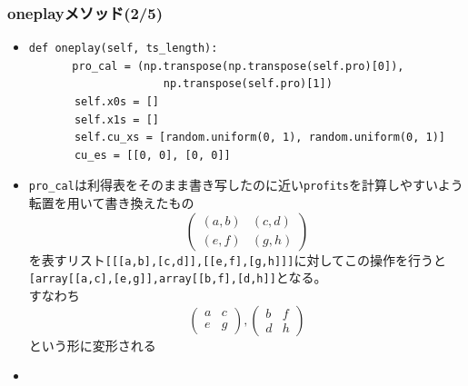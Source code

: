 \documentclass[dvipdfmx,fleqn,handout]{beamer}
\begin{document}
\begin{frame}[fragile]%
\frametitle{oneplayメソッド(2/5)}
\begin{itemize}\setlength{\parskip}{0.5em}
\item
\footnotesize
\begin{verbatim}
def oneplay(self, ts_length):
　　　　pro_cal = (np.transpose(np.transpose(self.pro)[0]),
                   　np.transpose(self.pro)[1])
       self.x0s = []
       self.x1s = []
       self.cu_xs = [random.uniform(0, 1), random.uniform(0, 1)]
       cu_es = [[0, 0], [0, 0]]
 \end{verbatim}
\normalsize
\item
\verb|pro_cal|は利得表をそのまま書き写したのに近い\verb|profits|を計算しやすいよう転置を用いて書き換えたもの\pause
\footnotesize
\begin{equation*}
\begin{pmatrix}
(a,b) & (c,d)\\
(e,f) & (g,h)
\end{pmatrix}
\end{equation*}
\normalsize
を表すリスト\verb|[[[a,b],[c,d]],[[e,f],[g,h]]]|に対してこの操作を行うと\pause
\verb|[array[[a,c],[e,g]],array[[b,f],[d,h]]|となる。\\すなわち
\footnotesize
\begin{equation*}
\begin{pmatrix}
a & c\\
e & g
\end{pmatrix},
\begin{pmatrix}
b & f\\
d & h
\end{pmatrix}
\end{equation*}
\normalsize
という形に変形される
\item
\end{itemize}
\end{frame}
 
\end{document}
